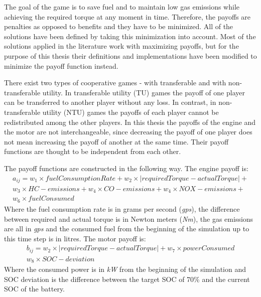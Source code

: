 The goal of the game is to save fuel and to maintain low gas emissions while achieving the required torque at any moment in time. Therefore, the payoffs are penalties as opposed to benefits and they have to be minimized. All of the solutions have been defined by taking this minimization into account. Most of the solutions applied in the literature work with maximizing payoffs, but for the purpose of this thesis their definitions and implementations have been modified to minimize the payoff function instead. 


There exist two types of cooperative games - with transferable and with non-transferable utility. In transferable utility (TU) games the payoff of one player can be transferred to another player without any loss. In contrast, in non-transferable utility (NTU) games the payoffs of each player cannot be redistributed among the other players. In this thesis the payoffs of the engine and the motor are not interchangeable, since decreasing the payoff of one player does not mean increasing the payoff of another at the same time. Their payoff functions are thought to be independent from each other.

The payoff functions are constructed in the following way. The engine payoff is:
\begin{equation}
\begin{split}
a_{ij} = w_1 \times fuelConsumptionRate + w_2 \times | requiredTorque - actualTorque | + \\
w_3 \times HC-emissions + w_4 \times CO-emissions + w_4 \times NOX-emissions + \\
w_6 \times fuelConsumed
\end{split}
\end{equation}
Where the fuel consumption rate is in grams per second (\textit{gps}), the difference between required and actual torque is in Newton meters (\textit{Nm}), the gas emissions are all in \textit{gps} and the consumed fuel from the beginning of the simulation up to this time step is in litres. The motor payoff is:
\begin{equation}
\begin{split}
b_{ij} = w_2 \times | requiredTorque - actualTorque | + w_7 \times powerConsumed\\
w_8 \times SOC-deviation
\end{split}
\end{equation}
Where the consumed power is in \textit{kW} from the beginning of the simulation and SOC deviation is the difference between the target SOC of 70\% and the current SOC of the battery.

